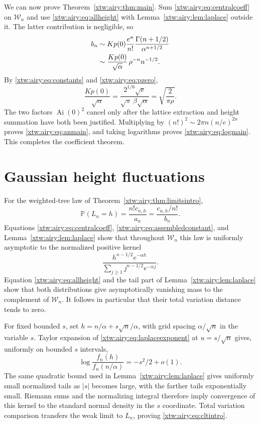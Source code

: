 \documentclass[11pt]{article}
\theoremstyle{remark}\newtheorem{remark}[theorem]{Remark}
\newcommand{\Ai}{\operatorname{Ai}}
\newcommand{\Prb}{\mathbb P}
\begin{document}
We can now prove Theorem~\ref{xtw:airy:thm:main}. Sum \eqref{xtw:airy:eq:centralcoeff} on
$\mathcal W_n$ and use \eqref{xtw:airy:eq:allheight} with Lemma~\ref{xtw:airy:lem:laplace}
outside it. The latter contribution is negligible, so
\begin{align}
 b_n&\sim Kp(0)\frac{e^n}{n!}
              \frac{\Gamma(n+1/2)}{\alpha^{n+1/2}}\notag\\
 &\sim\frac{Kp(0)}{\sqrt\alpha}\,\rho^{-n}n^{-1/2}.
 \label{xtw:airy:eq:assembledconstant}
\end{align}
By \eqref{xtw:airy:eq:constants} and \eqref{xtw:airy:eq:pzero},
\begin{equation}\label{xtw:airy:eq:cancelconstant}
 \frac{Kp(0)}{\sqrt\alpha}
 =\frac{2^{1/6}\sqrt e}{\sqrt\pi\,\beta\sqrt\alpha}
 =\sqrt{\frac{2}{\pi\rho}}.
\end{equation}
The two factors $\Ai(0)^2$ cancel only after the lattice extraction and
height summation have both been justified. Multiplying by
$(n!)^2\sim2\pi n(n/e)^{2n}$ proves \eqref{xtw:airy:eq:anmain}, and taking logarithms
proves \eqref{xtw:airy:eq:logmain}. This completes the coefficient theorem.

\section{Gaussian height fluctuations}\label{xtw:airy:sec:height}
For the weighted-tree law of Theorem~\ref{xtw:airy:thm:limitsintro},
\begin{equation}\label{xtw:airy:eq:heightprob}
 \Prb(L_n=h)=\frac{n!c_{n,h}}{a_n}
            =\frac{c_{n,h}/n!}{b_n}.
\end{equation}
Equations \eqref{xtw:airy:eq:centralcoeff}, \eqref{xtw:airy:eq:assembledconstant}, and
Lemma~\ref{xtw:airy:lem:laplace} show that throughout $\mathcal W_n$ this law is
uniformly asymptotic to the normalized positive kernel
\[
 \frac{h^{n-1/2}e^{-\alpha h}}{\sum_{j\ge1}j^{n-1/2}e^{-\alpha j}}.
\]
Equation \eqref{xtw:airy:eq:allheight} and the tail part of Lemma~\ref{xtw:airy:lem:laplace}
show that both distributions give asymptotically vanishing mass to the
complement of $\mathcal W_n$. It follows in particular that their total
variation distance tends to zero.

For fixed bounded $s$, set $h=n/\alpha+s\sqrt n/\alpha$, with grid spacing
$\alpha/\sqrt n$ in the variable $s$. Taylor expansion of
\eqref{xtw:airy:eq:laplaceexponent} at $u=s/\sqrt n$ gives, uniformly on bounded
$s$ intervals,
\[
 \log\frac{f_n(h)}{f_n(n/\alpha)}=-s^2/2+o(1).
\]
The same quadratic bound used in Lemma~\ref{xtw:airy:lem:laplace} gives uniformly
small normalized tails as $|s|$ becomes large, with the farther tails
exponentially small. Riemann sums and the normalizing integral therefore
imply convergence of this kernel to the standard normal density in the
$s$ coordinate. Total variation comparison transfers the weak limit to
$L_n$, proving \eqref{xtw:airy:eq:cltintro}.
\end{document}

